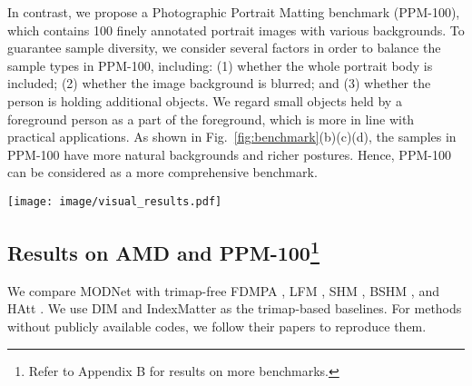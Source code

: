 \documentclass[letterpaper]{article} \usepackage{aaai22}  \usepackage{times}  \usepackage{helvet}  \usepackage{courier}  \usepackage[hyphens]{url}  \usepackage{graphicx} \urlstyle{rm} \def\UrlFont{\rm}  \usepackage{natbib}  \usepackage{caption} \usepackage{booktabs}
\begin{document}
In contrast, we propose a Photographic Portrait Matting benchmark (PPM-100), which contains 100 finely annotated portrait images with various backgrounds. To guarantee sample diversity, we consider several factors in order to balance the sample types in PPM-100, including: (1) whether the whole portrait body is included; (2) whether the image background is blurred; and (3) whether the person is holding additional objects. We regard small objects held by a foreground person as a part of the foreground, which is more in line with practical applications. 
As shown in Fig.~\ref{fig:benchmark}(b)(c)(d), the samples in PPM-100 have more natural backgrounds and richer postures. Hence, PPM-100 can be considered as a more comprehensive benchmark.

\begin{figure*}[ht]
\begin{center}
  \texttt{[image: image/visual\_results.pdf]}
\end{center}
  \caption{\textbf{Visual Comparison of Trimap-free Methods on PPM-100.}
    MODNet performs better in hollow structures (the 1$st$ row) and hair details (the 2$nd$ row). However, it may still make mistakes in challenging poses or costumes (the 3$rd$ row). DIM \cite{DIM} here does not take trimaps as input, but is pre-trained on the SPS \cite{SPS} dataset. 
  }
\label{fig:visual_results}
\end{figure*}


\subsection{Results on AMD and PPM-100\footnote{Refer to Appendix B for results on more benchmarks.}}\label{sec:benchmark_results}
We compare MODNet with trimap-free FDMPA \cite{FDMPA}, LFM \cite{LFM}, SHM \cite{SHM}, BSHM \cite{BSHM}, and HAtt \cite{HAtt}. We use DIM \cite{DIM} and IndexMatter \cite{IndexMatter} as the trimap-based baselines. For methods without publicly available codes, we follow their papers to reproduce them.
\end{document}
